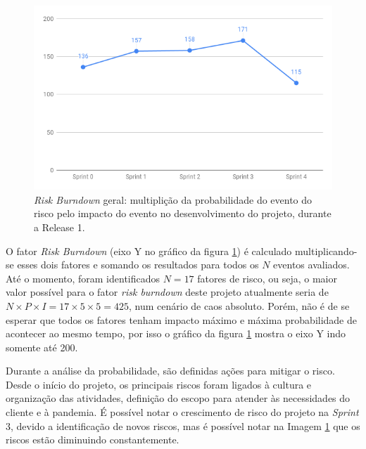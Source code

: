 \begin{figure}[ht]
  \includegraphics[scale=0.75]{figuras/burndownrisco.png}
  \caption{\textit{Risk Burndown} geral: multiplição da  probabilidade do evento do risco pelo impacto do evento no desenvolvimento do projeto, durante a Release 1.} 
  \label{fig:riscogeral}
\end{figure}

O fator {\em Risk Burndown} (eixo Y no gráfico da figura \ref{fig:riscogeral}) é calculado multiplicando-se esses dois fatores e somando os resultados para todos os $N$ eventos avaliados.
Até o momento, foram identificados $N=17$ fatores de risco, ou seja, o maior valor possível para o fator {\em risk burndown} deste projeto atualmente seria de $N \times P \times I = 17 \times 5 \times 5 = 425$, num cenário de caos absoluto.
Porém, não é de se esperar que todos os fatores tenham impacto máximo e máxima probabilidade de acontecer ao mesmo tempo, por isso o gráfico da figura \ref{fig:riscogeral} mostra o eixo Y indo somente até 200.

Durante a análise da probabilidade, são definidas ações para mitigar o risco. Desde o início do projeto, os principais riscos foram ligados à cultura e organização das atividades, definição do escopo para atender às necessidades do cliente e à pandemia. É possível notar o crescimento de risco do projeto na {\em Sprint} 3, devido a identificação de novos riscos, mas é possível notar na Imagem \ref{fig:riscogeral} que os riscos estão diminuindo constantemente.